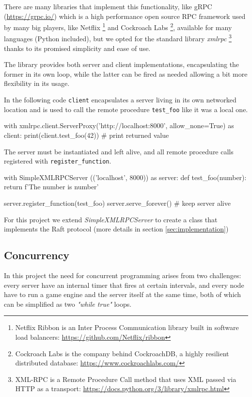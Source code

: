 There are many libraries that implement this functionality, like gRPC (\url{https://grpc.io/}) which is a high performance open source RPC framework used by many big players, like Netflix \footnote{Netflix Ribbon is an Inter Process Communication library built in software load balancers: \url{https://github.com/Netflix/ribbon}} and Cockroach Labs \footnote{Cockroach Labs is the company behind CockroachDB, a highly resilient distributed database: \url{https://www.cockroachlabs.com/}}, available for many languages (Python included), but we opted for the standard library \textit{xmlrpc} \footnote{XML-RPC is a Remote Procedure Call method that uses XML passed via HTTP as a transport: \url{https://docs.python.org/3/library/xmlrpc.html}} thanks to its promised simplicity and ease of use. 

The library provides both server and client implementations, encapsulating the former in its own loop, while the latter can be fired as needed allowing a bit more flexibility in its usage.

In the following code \verb|client| encapsulates a server living in its own networked location and is used to call the remote procedure \verb|test_foo| like it was a local one.

\begin{python}
with xmlrpc.client.ServerProxy('http://localhost:8000', allow_none=True) as client:
    print(client.test_foo(42)) # print returned value
\end{python}

The server must be instantiated and left alive, and all remote procedure calls registered with \verb|register_function|.

\begin{python}
with SimpleXMLRPCServer (('localhost', 8000)) as server:
    def test_foo(number):
        return f'The number is {number}'

    server.register_function(test_foo)  
    server.serve_forever() # keep server alive
\end{python}

For this project we extend \textit{SimpleXMLRPCServer} to create a class that implements the Raft protocol (more details in section \ref{sec:implementation})

\subsection{Concurrency} \label{sec:threading}

In this project the need for concurrent programming arises from two challenges: every server have an internal timer that fires at certain intervals, and every node have to run a game engine and the server itself at the same time, both of which can be simplified as two \textit{"while true"} loops. 

